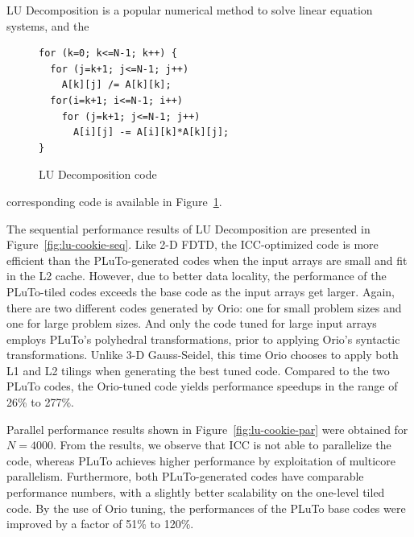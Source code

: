 LU Decomposition is a popular numerical method to solve linear
equation systems, and the 
%
\begin{figure}
\begin{center}
\vspace{-.25in}
\begin{minipage}{2.8in} 
\scriptsize
\begin{verbatim} 
for (k=0; k<=N-1; k++) { 
  for (j=k+1; j<=N-1; j++) 
    A[k][j] /= A[k][k]; 
  for(i=k+1; i<=N-1; i++) 
    for (j=k+1; j<=N-1; j++) 
      A[i][j] -= A[i][k]*A[k][j]; 
} 
\end{verbatim} 
\end{minipage} 
\end{center}
\vspace{-0.2in}
\caption{LU Decomposition code} 
\label{fig:lu-code} 
\end{figure}
%
corresponding code is available in Figure~\ref{fig:lu-code}. 

The sequential performance results of LU Decomposition are presented
in Figure~\ref{fig:lu-cookie-seq}. Like 2-D FDTD, the ICC-optimized
code is more efficient than the PLuTo-generated codes when the input
arrays are small and fit in the L2 cache. However, due to better data
locality, the performance of the PLuTo-tiled codes exceeds the base
code as the input arrays get larger. Again, there are two different
codes generated by Orio: one for small problem sizes and one for large
problem sizes. And only the code tuned for large input arrays employs
PLuTo's polyhedral transformations, prior to applying Orio's syntactic
transformations. Unlike 3-D Gauss-Seidel, this time Orio chooses to
apply both L1 and L2 tilings when generating the best tuned
code. Compared to the two PLuTo codes, the Orio-tuned code yields
performance speedups in the range of 26\% to 277\%.

Parallel performance results shown in Figure~\ref{fig:lu-cookie-par}
were obtained for $N=4000$. From the results, we observe that ICC is
not able to parallelize the code, whereas PLuTo achieves higher
performance by exploitation of multicore parallelism. Furthermore,
both PLuTo-generated codes have comparable performance numbers, with a
slightly better scalability on the one-level tiled code. By the use of
Orio tuning, the performances of the PLuTo base codes were improved by
a factor of 51\% to 120\%.
 
